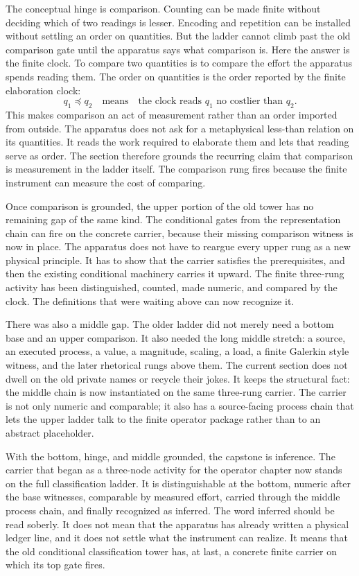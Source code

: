 The conceptual hinge is comparison. Counting can be made finite without deciding
which of two readings is lesser. Encoding and repetition can be installed without
settling an order on quantities. But the ladder cannot climb past the old
comparison gate until the apparatus says what comparison is. Here the answer is
the finite clock. To compare two quantities is to compare the effort the
apparatus spends reading them. The order on quantities is the order reported by
the finite elaboration clock:
\[
  q_1 \preceq q_2
  \quad\text{means}\quad
  \text{the clock reads } q_1 \text{ no costlier than } q_2.
\]
This makes comparison an act of measurement rather than an order imported from
outside. The apparatus does not ask for a metaphysical less-than relation on its
quantities. It reads the work required to elaborate them and lets that reading
serve as order. The section therefore grounds the recurring claim that comparison
is measurement in the ladder itself. The comparison rung fires because the finite
instrument can measure the cost of comparing.

Once comparison is grounded, the upper portion of the old tower has no remaining
gap of the same kind. The conditional gates from the representation chain can
fire on the concrete carrier, because their missing comparison witness is now in
place. The apparatus does not have to reargue every upper rung as a new physical
principle. It has to show that the carrier satisfies the prerequisites, and then
the existing conditional machinery carries it upward. The finite three-rung
activity has been distinguished, counted, made numeric, and compared by the
clock. The definitions that were waiting above can now recognize it.

There was also a middle gap. The older ladder did not merely need a bottom base
and an upper comparison. It also needed the long middle stretch: a source,
an executed process, a value, a magnitude, scaling, a load, a finite Galerkin
style witness, and the later rhetorical rungs above them. The
current section does not dwell on the old private names or recycle their jokes.
It keeps the structural fact: the middle chain is now instantiated on the same
three-rung carrier. The carrier is not only numeric and comparable; it also has a
source-facing process chain that lets the upper ladder talk to the finite
operator package rather than to an abstract placeholder.

With the bottom, hinge, and middle grounded, the capstone is inference. The
carrier that began as a three-node activity for the operator chapter now stands
on the full classification ladder. It is distinguishable at the bottom, numeric
after the base witnesses, comparable by measured effort, carried through the
middle process chain, and finally recognized as inferred. The word inferred
should be read soberly. It does not mean that the apparatus has already written a
physical ledger line, and it does not settle what the instrument can realize.
It means that the old conditional classification tower has, at last, a concrete
finite carrier on which its top gate fires.

